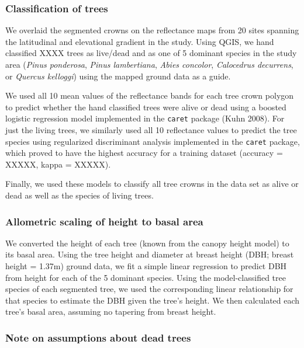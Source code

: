 \documentclass[]{article}
\begin{document}
\subsubsection{Classification of trees}\label{classification-of-trees}

We overlaid the segmented crowns on the reflectance maps from 20 sites
spanning the latitudinal and elevational gradient in the study. Using
QGIS, we hand classified XXXX trees as live/dead and as one of 5
dominant species in the study area (\emph{Pinus ponderosa}, \emph{Pinus
lambertiana}, \emph{Abies concolor}, \emph{Calocedrus decurrens}, or
\emph{Quercus kelloggi}) using the mapped ground data as a guide.

We used all 10 mean values of the reflectance bands for each tree crown
polygon to predict whether the hand classified trees were alive or dead
using a boosted logistic regression model implemented in the
\texttt{caret} package (Kuhn 2008). For just the living trees, we
similarly used all 10 reflectance values to predict the tree species
using regularized discriminant analysis implemented in the
\texttt{caret} package, which proved to have the highest accuracy for a
training dataset (accuracy = XXXXX, kappa = XXXXX).

Finally, we used these models to classify all tree crowns in the data
set as alive or dead as well as the species of living trees.

\subsubsection{Allometric scaling of height to basal
area}\label{allometric-scaling-of-height-to-basal-area}

We converted the height of each tree (known from the canopy height
model) to its basal area. Using the tree height and diameter at breast
height (DBH; breast height = 1.37m) ground data, we fit a simple linear
regression to predict DBH from height for each of the 5 dominant
species. Using the model-classified tree species of each segmented tree,
we used the corresponding linear relationship for that species to
estimate the DBH given the tree's height. We then calculated each tree's
basal area, assuming no tapering from breast height.

\subsubsection{Note on assumptions about dead
trees}\label{note-on-assumptions-about-dead-trees}
\end{document}
